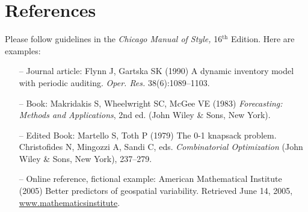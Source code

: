 \documentclass[11pt]{article}
\begin{document}
	
	
	
	\section*{References}
	
	\bgroup
	\parskip0pt
	
	Please follow guidelines in the \textit{Chicago Manual of Style,} 16$^{\text{th}}$ Edition. Here are examples: 
	
	\begin{itemize}
		\item[--] Journal article: Flynn J, Gartska SK (1990) A dynamic inventory model with periodic auditing. \textit{Oper. Res.} 38(6):1089--1103. 
		\item[--] Book: Makridakis S, Wheelwright SC, McGee VE (1983) \textit{Forecasting: Methods and Applications}, 2nd ed. (John Wiley {\&} Sons, New York). 
		\item[--] Edited Book: Martello S, Toth P (1979) The 0-1 knapsack problem. Christofides N, Mingozzi A, Sandi C, eds. \textit{Combinatorial Optimization} (John Wiley {\&} Sons, New York), 237--279.
		\item[--] Online reference, fictional example: American Mathematical Institute (2005) Better predictors of geospatial variability. Retrieved June 14, 2005, \underline {www.mathematicsinstitute}.
		
		
	\end{itemize}
	
	
	
	
	
	\egroup
	
\end{document}
